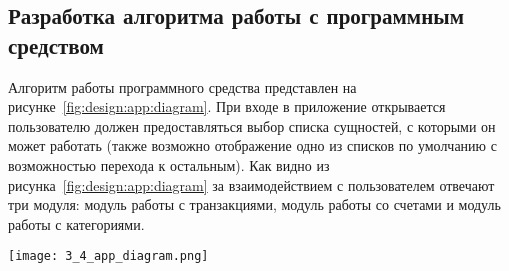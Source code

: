 \subsection{Разработка алгоритма работы с программным средством}
\label{sec:design:app}

Алгоритм работы программного средства представлен на рисунке~\ref{fig:design:app:diagram}.
При входе в приложение открывается пользователю должен предоставляться выбор списка сущностей, с которыми он может работать (также возможно отображение одно из списков по умолчанию с возможностью перехода к остальным).
Как видно из рисунка~\ref{fig:design:app:diagram} за взаимодействием с пользователем отвечают три модуля: модуль работы с транзакциями, модуль работы со счетами и модуль работы с категориями.

\begin{sidewaysfigure}
    \centering
    \texttt{[image: 3\_4\_app\_diagram.png]}
    \caption{Схема программного средства}
    \label{fig:design:app:diagram}
\end{sidewaysfigure}

